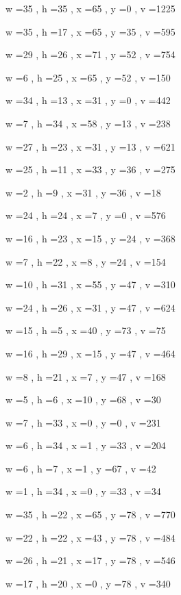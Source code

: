 \documentclass[11pt]{article}
\begin{document}
w =35 , h =35 , x =65 , y =0 , v =1225
\par
w =35 , h =17 , x =65 , y =35 , v =595
\par
w =29 , h =26 , x =71 , y =52 , v =754
\par
w =6 , h =25 , x =65 , y =52 , v =150
\par
w =34 , h =13 , x =31 , y =0 , v =442
\par
w =7 , h =34 , x =58 , y =13 , v =238
\par
w =27 , h =23 , x =31 , y =13 , v =621
\par
w =25 , h =11 , x =33 , y =36 , v =275
\par
w =2 , h =9 , x =31 , y =36 , v =18
\par
w =24 , h =24 , x =7 , y =0 , v =576
\par
w =16 , h =23 , x =15 , y =24 , v =368
\par
w =7 , h =22 , x =8 , y =24 , v =154
\par
w =10 , h =31 , x =55 , y =47 , v =310
\par
w =24 , h =26 , x =31 , y =47 , v =624
\par
w =15 , h =5 , x =40 , y =73 , v =75
\par
w =16 , h =29 , x =15 , y =47 , v =464
\par
w =8 , h =21 , x =7 , y =47 , v =168
\par
w =5 , h =6 , x =10 , y =68 , v =30
\par
w =7 , h =33 , x =0 , y =0 , v =231
\par
w =6 , h =34 , x =1 , y =33 , v =204
\par
w =6 , h =7 , x =1 , y =67 , v =42
\par
w =1 , h =34 , x =0 , y =33 , v =34
\par
w =35 , h =22 , x =65 , y =78 , v =770
\par
w =22 , h =22 , x =43 , y =78 , v =484
\par
w =26 , h =21 , x =17 , y =78 , v =546
\par
w =17 , h =20 , x =0 , y =78 , v =340
\par
\newpage
\end{document}
